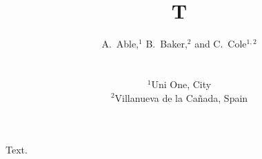 \documentclass{mnras}
\title{T}
\author[A. Able et al.]
{\parbox{\textwidth}{\raggedright A.~Able,$^{1}$
B.~Baker,$^{2}$ and C.~Cole$^{1,2}$}\vspace{0.4cm}\\
\parbox{\textwidth}{\raggedright $^{1}$Uni One, City\\
$^{2}$Villanueva de la Ca\~nada, Spain}}
\begin{document}
\maketitle
Text.
\end{document}
